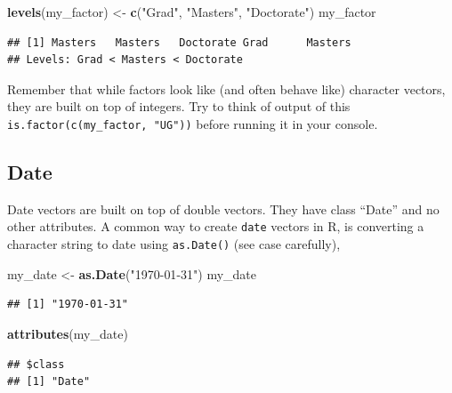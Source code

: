\documentclass[
]{book}
\newenvironment{Shaded}{\begin{snugshade}}{\end{snugshade}}
\newcommand{\FunctionTok}[1]{\textcolor[rgb]{0.13,0.29,0.53}{\textbf{#1}}}
\newcommand{\NormalTok}[1]{#1}
\newcommand{\OtherTok}[1]{\textcolor[rgb]{0.56,0.35,0.01}{#1}}
\newcommand{\StringTok}[1]{\textcolor[rgb]{0.31,0.60,0.02}{#1}}
\begin{document}
\begin{Shaded}
\begin{Highlighting}[]
\FunctionTok{levels}\NormalTok{(my\_factor) }\OtherTok{\textless{}{-}} \FunctionTok{c}\NormalTok{(}\StringTok{"Grad"}\NormalTok{, }\StringTok{"Masters"}\NormalTok{, }\StringTok{"Doctorate"}\NormalTok{)}
\NormalTok{my\_factor}
\end{Highlighting}
\end{Shaded}

\begin{verbatim}
## [1] Masters   Masters   Doctorate Grad      Masters  
## Levels: Grad < Masters < Doctorate
\end{verbatim}

Remember that while factors look like (and often behave like) character vectors, they are built on top of integers. Try to think of output of this \texttt{is.factor(c(my\_factor,\ "UG"))} before running it in your console.

\hypertarget{date}{%
\subsection{Date}\label{date}}

Date vectors are built on top of double vectors. They have class ``Date'' and no other attributes. A common way to create \texttt{date} vectors in R, is converting a character string to date using \texttt{as.Date()} (see case carefully),

\begin{Shaded}
\begin{Highlighting}[]
\NormalTok{my\_date }\OtherTok{\textless{}{-}} \FunctionTok{as.Date}\NormalTok{(}\StringTok{"1970{-}01{-}31"}\NormalTok{)}
\NormalTok{my\_date}
\end{Highlighting}
\end{Shaded}

\begin{verbatim}
## [1] "1970-01-31"
\end{verbatim}

\begin{Shaded}
\begin{Highlighting}[]
\FunctionTok{attributes}\NormalTok{(my\_date)}
\end{Highlighting}
\end{Shaded}

\begin{verbatim}
## $class
## [1] "Date"
\end{verbatim}
\end{document}
